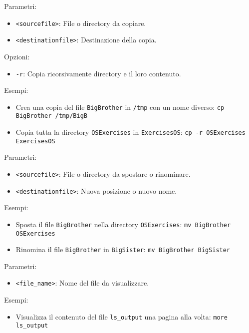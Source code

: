 \vskip3mm
Parametri:
\begin{itemize}
	\item \verb|<sourcefile>|: File o directory da copiare.
	\item \verb|<destinationfile>|: Destinazione della copia.
\end{itemize}
Opzioni:
\begin{itemize}
	\item \verb|-r|: Copia ricorsivamente directory e il loro contenuto.
\end{itemize}
Esempi:
\begin{itemize}
	\item Crea una copia del file \verb|BigBrother| in \verb|/tmp| con un nome diverso:
	      \vskip3mm
	      \verb|cp BigBrother /tmp/BigB|
	\item Copia tutta la directory \verb|OSExercises| in \verb|ExercisesOS|:
	      \vskip3mm
	      \verb|cp -r OSExercises ExercisesOS|
\end{itemize}

\vskip3mm
Parametri:
\begin{itemize}
	\item \verb|<sourcefile>|: File o directory da spostare o rinominare.
	\item \verb|<destinationfile>|: Nuova posizione o nuovo nome.
\end{itemize}
Esempi:
\begin{itemize}
	\item Sposta il file \verb|BigBrother| nella directory \verb|OSExercises|:
	      \vskip3mm
	      \verb|mv BigBrother OSExercises|
	\item Rinomina il file \verb|BigBrother| in \verb|BigSister|:
	      \vskip3mm
	      \verb|mv BigBrother BigSister|
\end{itemize}

\vskip3mm
Parametri:
\begin{itemize}
	\item \verb|<file_name>|: Nome del file da visualizzare.
\end{itemize}
Esempi:
\begin{itemize}
	\item Visualizza il contenuto del file \verb|ls_output| una pagina alla volta:
	      \vskip3mm
	      \verb|more ls_output|
\end{itemize}

